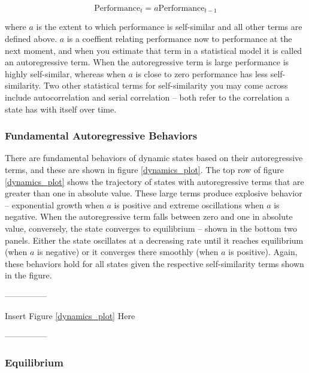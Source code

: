 \documentclass[english,,man]{apa6}
\theoremstyle{definition}
\theoremstyle{definition}
\theoremstyle{definition}
\theoremstyle{remark}
\begin{document}
\begin{equation}
\textrm{Performance}_{t} = a \textrm{Performance}_{t-1}
\end{equation}

\noindent where \(a\) is the extent to which performance is self-similar
and all other terms are defined above. \(a\) is a coeffient relating
performance now to performance at the next moment, and when you estimate
that term in a statistical model it is called an autoregressive term.
When the autoregressive term is large performance is highly
self-similar, whereas when \(a\) is close to zero performance has less
self-similarity. Two other statistical terms for self-similarity you may
come across include autocorrelation and serial correlation -- both refer
to the correlation a state has with itself over time.

\hypertarget{fundamental-autoregressive-behaviors}{%
\subsubsection{Fundamental Autoregressive
Behaviors}\label{fundamental-autoregressive-behaviors}}

There are fundamental behaviors of dynamic states based on their
autoregressive terms, and these are shown in figure \ref{dynamics_plot}.
The top row of figure \ref{dynamics_plot} shows the trajectory of states
with autoregressive terms that are greater than one in absolute value.
These large terms produce explosive behavior -- exponential growth when
\(a\) is positive and extreme oscillations when \(a\) is negative. When
the autoregressive term falls between zero and one in absolute value,
conversely, the state converges to equilibrium -- shown in the bottom
two panels. Either the state oscillates at a decreasing rate until it
reaches equilibrium (when \(a\) is negative) or it converges there
smoothly (when \(a\) is positive). Again, these behaviors hold for all
states given the respective self-similarity terms shown in the figure.

\begin{center}

---------------

Insert Figure \ref{dynamics_plot} Here

---------------

\end{center}

\hypertarget{equilibrium}{%
\subsubsection{Equilibrium}\label{equilibrium}}
\end{document}
